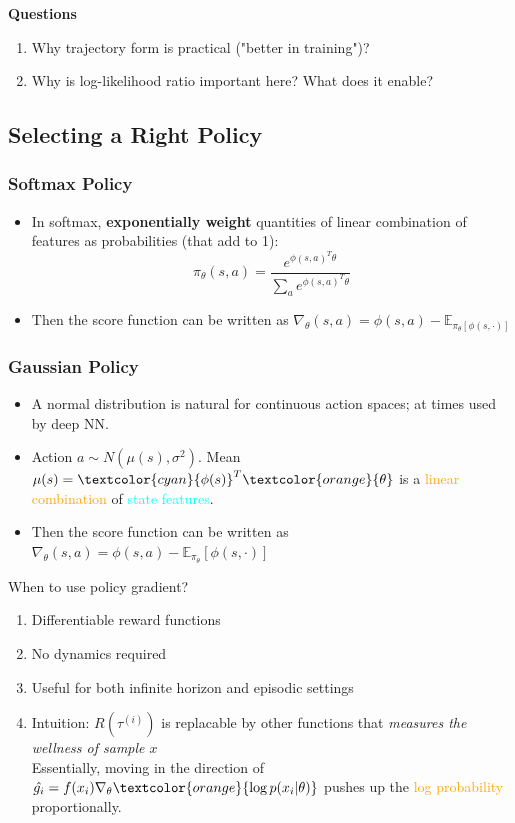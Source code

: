 \documentclass{article}
\begin{document}
\begin{hintbox}
    \textbf{Questions}
    \begin{enumerate}
    \item Why trajectory form is practical ("better in training")?
    \item Why is log-likelihood ratio important here? What does it enable?
    \end{enumerate}
\end{hintbox}

\subsection{Selecting a Right Policy}

\subsubsection{Softmax Policy}
\begin{itemize}
\item In softmax, \textbf{exponentially weight} quantities of linear combination of features as probabilities (that add to 1):
    \begin{equation*}
        \pi_{\theta}(s, a) = \frac{e^{\phi (s, a)^{T} \theta}}{\sum_{a} e^{\phi (s, a)^{T} \theta}}
    \end{equation*}
\item Then the score function can be written as 
    $\nabla_{\theta}(s, a) = \phi(s, a) - \mathbb{E}_{\pi_{\theta} [ \phi(s, \cdot) ]}$
\end{itemize}

\subsubsection{Gaussian Policy}
\begin{itemize}
\item A normal distribution is natural for continuous action spaces; at times used by deep NN.
\item Action $a \sim N(\mu(s), \sigma^2)$. Mean $\mu(s) = \textcolor{cyan}{\phi(s)}^{T} \textcolor{orange}{\theta}$ is a \textcolor{orange}{linear combination} of \textcolor{cyan}{state features}. 
\item Then the score function can be written as $\nabla_{\theta}(s, a) = \phi(s, a) - \mathbb{E}_{\pi_{\theta}} \left[ \phi(s, \cdot)\right]$
\end{itemize}

When to use policy gradient?
\begin{enumerate}
\item Differentiable reward functions
\item No dynamics required
\item Useful for both infinite horizon and episodic settings
\item Intuition: $R(\tau^{(i)})$ is replacable by other functions that \textit{measures the wellness of sample $x$}
    \\Essentially, moving in the direction of $\hat{g_{i}} = f(x_i) \nabla_{\theta} \textcolor{orange}{\log p(x_i | \theta)}$ pushes up the \textcolor{orange}{log probability} proportionally.
\end{enumerate}
\end{document}
